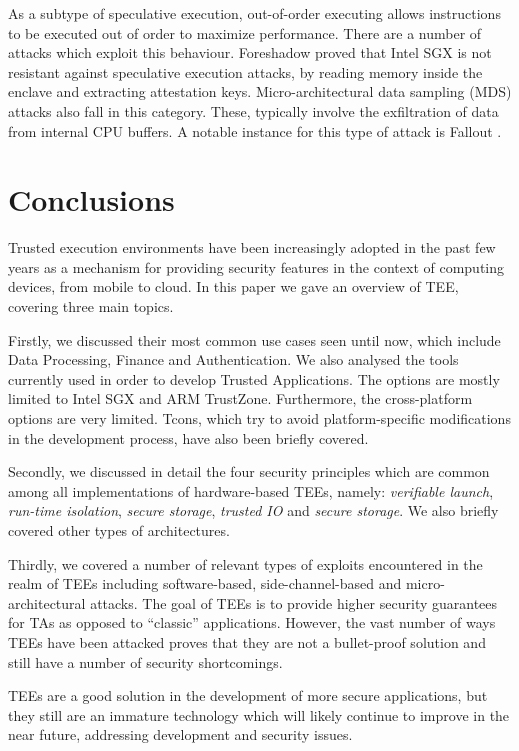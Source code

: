 \documentclass[runningheads,a4paper]{uwsese}
\begin{document}
As a subtype of speculative execution, out-of-order executing allows
instructions to be executed out of order to maximize performance. There are a
number of attacks which exploit this behaviour. Foreshadow \cite{foreshadow}
proved that Intel SGX is not resistant against speculative execution attacks,
by reading memory inside the enclave and extracting attestation keys.
Micro-architectural data sampling (MDS) attacks also fall in this category.
These, typically involve the exfiltration of data from internal CPU buffers.
A notable instance for this type of attack is Fallout \cite{fallout}.


\section{Conclusions}

Trusted execution environments have been increasingly adopted in the past few
years as a mechanism for providing security features in the context of
computing devices, from mobile to cloud. In this paper we gave an overview of
TEE, covering three main topics.

Firstly, we discussed their most common use cases seen until now, which include Data
Processing, Finance and Authentication. We also analysed the tools currently
used in order to develop Trusted Applications. The options are mostly limited
to Intel SGX and ARM TrustZone. Furthermore, the cross-platform options are
very limited. Tcons, which try to avoid platform-specific modifications in the
development process, have also been briefly covered.

Secondly, we discussed in detail the four security principles which are common
among all implementations of hardware-based TEEs, namely: \emph{verifiable
launch}, \emph{run-time isolation}, \emph{secure storage}, \emph{trusted IO}
and \emph{secure storage}. We also briefly covered other types of
architectures.

Thirdly, we covered a number of relevant types of exploits encountered in the
realm of TEEs including software-based, side-channel-based and
micro-architectural attacks. The goal of TEEs is to provide higher security
guarantees for TAs as opposed to ``classic'' applications. However, the vast
number of ways TEEs have been attacked proves that they are not a bullet-proof 
solution and still have a number of security shortcomings.

TEEs are a good solution in the development of more secure applications, but
they still are an immature technology which will likely continue to improve
in the near future, addressing development and security issues.
\end{document}
